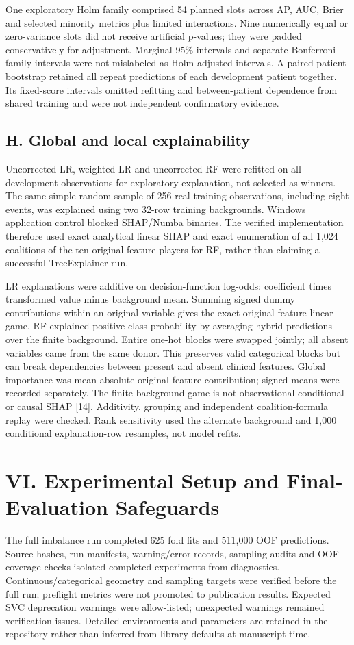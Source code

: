 \documentclass[10pt,twocolumn,letterpaper]{article}
\begin{document}
One exploratory Holm family comprised 54 planned slots across AP, AUC, Brier and selected minority metrics plus limited interactions. Nine numerically equal or zero-variance slots did not receive artificial p-values; they were padded conservatively for adjustment. Marginal 95\% intervals and separate Bonferroni family intervals were not mislabeled as Holm-adjusted intervals. A paired patient bootstrap retained all repeat predictions of each development patient together. Its fixed-score intervals omitted refitting and between-patient dependence from shared training and were not independent confirmatory evidence.


\subsection*{H. Global and local explainability}
Uncorrected LR, weighted LR and uncorrected RF were refitted on all development observations for exploratory explanation, not selected as winners. The same simple random sample of 256 real training observations, including eight events, was explained using two 32-row training backgrounds. Windows application control blocked SHAP/Numba binaries. The verified implementation therefore used exact analytical linear SHAP and exact enumeration of all 1,024 coalitions of the ten original-feature players for RF, rather than claiming a successful TreeExplainer run.


LR explanations were additive on decision-function log-odds: coefficient times transformed value minus background mean. Summing signed dummy contributions within an original variable gives the exact original-feature linear game. RF explained positive-class probability by averaging hybrid predictions over the finite background. Entire one-hot blocks were swapped jointly; all absent variables came from the same donor. This preserves valid categorical blocks but can break dependencies between present and absent clinical features. Global importance was mean absolute original-feature contribution; signed means were recorded separately. The finite-background game is not observational conditional or causal SHAP [14]. Additivity, grouping and independent coalition-formula replay were checked. Rank sensitivity used the alternate background and 1,000 conditional explanation-row resamples, not model refits.


\section*{VI. Experimental Setup and Final-Evaluation Safeguards}
The full imbalance run completed 625 fold fits and 511,000 OOF predictions. Source hashes, run manifests, warning/error records, sampling audits and OOF coverage checks isolated completed experiments from diagnostics. Continuous/categorical geometry and sampling targets were verified before the full run; preflight metrics were not promoted to publication results. Expected SVC deprecation warnings were allow-listed; unexpected warnings remained verification issues. Detailed environments and parameters are retained in the repository rather than inferred from library defaults at manuscript time.
\end{document}

